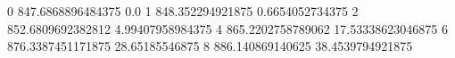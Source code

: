 0 847.6868896484375 0.0
1 848.352294921875 0.6654052734375
2 852.6809692382812 4.99407958984375
4 865.2202758789062 17.53338623046875
6 876.3387451171875 28.65185546875
8 886.140869140625 38.4539794921875
